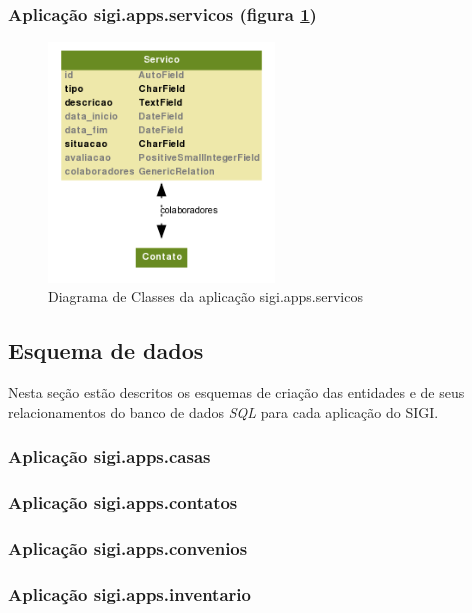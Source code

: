 \subsubsection{Aplicação sigi.apps.servicos (figura \ref{fig:servicos})}
\begin{figure}[h!]
  \centering
  \includegraphics[width=60mm]{../imagens/servicos.png}
  \caption{Diagrama de Classes da aplicação sigi.apps.servicos}
  \label{fig:servicos}
\end{figure}

\subsection{Esquema de dados}
\label{sec:esquema}

Nesta seção estão descritos os esquemas de criação das entidades e de
seus relacionamentos do banco de dados \emph{SQL} para cada aplicação
do SIGI.

\small
\subsubsection{Aplicação sigi.apps.casas}


\subsubsection{Aplicação sigi.apps.contatos}


\subsubsection{Aplicação sigi.apps.convenios}


\subsubsection{Aplicação sigi.apps.inventario}


